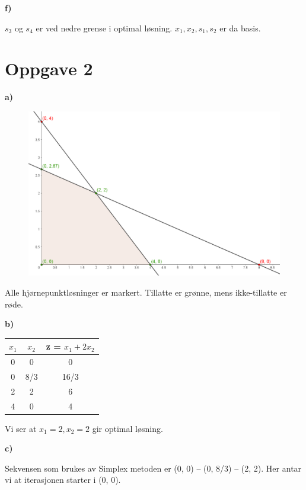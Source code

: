 \documentclass{article}
\begin{document}
    \small\textbf{f)}

    $s_3$ og $s_4$ er ved nedre grense i optimal løsning. $x_1, x_2, s_1, s_2$ er da basis.

    
    \section*{\textbf{Oppgave 2}}
    \small\textbf{a)}
    \begin{figure}[ht]
        \includegraphics*[width=\linewidth]{img/2a.PNG}
    \end{figure}
    
    
    Alle hjørnepunktløsninger er markert. Tillatte er grønne, mens ikke-tillatte er røde.

    \small\textbf{b)}
    
    \begin{table}[h!]
        \centering
        \begin{tabular}{|c|c|c|}
            \hline
            $x_1$ & $x_2 $ & z = $x_1 + 2x_2$ \\\hline
            0 & 0 & 0 \\\hline
            0 & 8/3 & 16/3 \\\hline
            2 & 2 & 6 \\\hline
            4 & 0 & 4 \\\hline
        \end{tabular}
    \end{table}
    
    Vi ser at $x_1 = 2, x_2 = 2$ gir optimal løsning. 
    
    \small\textbf{c)}
    
    Sekvensen som brukes av Simplex metoden er (0, 0) -- (0, 8/3) -- (2, 2). Her antar vi at iterasjonen starter i (0, 0).
    
\end{document}
